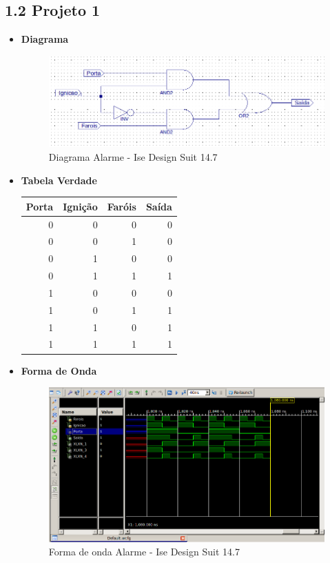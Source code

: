 \documentclass[12pts]{article}
\begin{document}
\subsection{1.2 Projeto 1}

\begin{itemize}
	\item \textbf{Diagrama}

\begin{figure}[!htb]
  \centering
  \includegraphics[scale=0.5]{imagens/diagrama01}
  \caption{Diagrama Alarme - Ise Design Suit 14.7}
  \label{figRotulo}
\end{figure}		
	
	\item \textbf{Tabela Verdade}
\begin{center}
	\begin{tabular}{|r|r|r|r|}
		\hline
		Porta & Ignição & Faróis & Saída \\
		\hline
		0 & 0 & 0 & 0 \\
		\hline
		0 & 0 & 1 & 0 \\
		\hline
		0 & 1 & 0 & 0 \\
		\hline
		0 & 1 & 1 & 1 \\
		\hline
		1 & 0 & 0 & 0 \\
		\hline
		1 & 0 & 1 & 1 \\
		\hline
		1 & 1 & 0 & 1 \\
		\hline
		1 & 1 & 1 & 1 \\
		\hline
	\end{tabular}
\end{center}

	\item \textbf{Forma de Onda}	

\begin{figure}[!htb]
  \centering
  \includegraphics[scale=0.5]{imagens/projeto01}
  \caption{Forma de onda Alarme - Ise Design Suit 14.7}
  \label{figRotulo}
\end{figure}				
	
\end{itemize}
\end{document}
